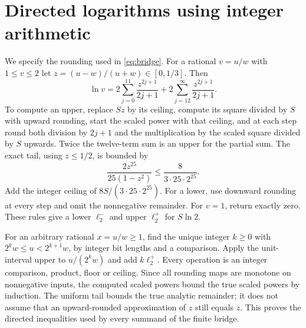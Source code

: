 \documentclass[11pt,a4paper]{article}
\numberwithin{equation}{section}
\theoremstyle{remark}
\begin{document}
\section{Directed logarithms using integer arithmetic}\label{app:logs}
We specify the rounding used in \eqref{eq:bridge}.
For a rational $v=u/w$ with $1\le v\le2$ let
$z=(u-w)/(u+w)\in[0,1/3]$. Then
\[
 \ln v=2\sum_{j=0}^{11}\frac{z^{2j+1}}{2j+1}
              +2\sum_{j=12}^\infty\frac{z^{2j+1}}{2j+1}.
\]
To compute an upper, replace $Sz$ by its ceiling, compute its square
divided by $S$ with upward rounding, start the scaled power with that
ceiling, and at each step round both division by $2j+1$ and the
multiplication by the scaled square divided by $S$ upwards.
Twice the twelve-term sum is an upper for the partial sum.
The exact tail, using $z\le1/2$, is bounded by
\[
 \frac{2z^{25}}{25(1-z^2)}
                  \le\frac8{3\cdot25\cdot2^{25}}.
\]
Add the integer ceiling of $8S/(3\cdot25\cdot2^{25})$.
For a lower, use downward rounding at every step and omit the
nonnegative remainder.
For $v=1$, return exactly zero.
These rules give a lower $\ell^-_2$ and upper $\ell^+_2$ for $S\ln2$.

For an arbitrary rational $x=u/w\ge1$, find the unique integer $k\ge0$
with $2^kw\le u<2^{k+1}w$, by integer bit lengths and a comparison.
Apply the unit-interval upper to $u/(2^kw)$ and add $k\ell^+_2$.
Every operation is an integer comparison, product, floor or ceiling.
Since all rounding maps are monotone on nonnegative inputs, the computed
scaled powers bound the true scaled powers by induction.
The uniform tail bounds the true analytic remainder; it does not assume
that an upward-rounded approximation of $z$ still equals $z$.
This proves the directed inequalities used by every summand of the
finite bridge.
\end{document}
